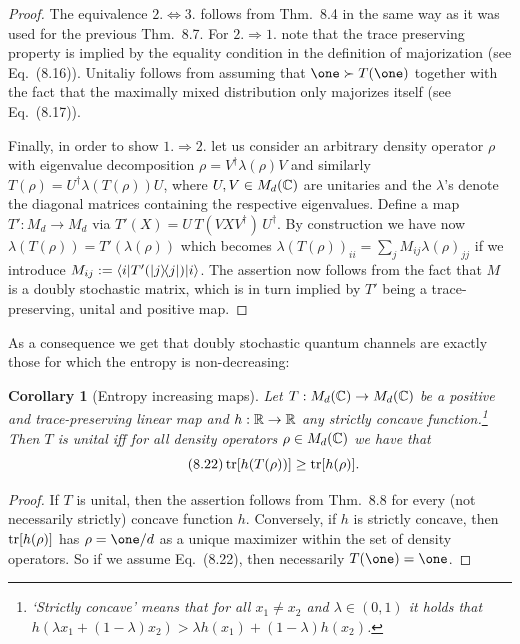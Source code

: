\documentclass[11pt,a4paper]{article}
\theoremstyle{plain}
\newtheorem{corollary}{Corollary}[section]
\theoremstyle{definition}
\theoremstyle{remark}
\begin{document}
\begin{proof}
    The equivalence $2.\Leftrightarrow 3$. follows from Thm.~8.4 in the same way as it was used for the previous Thm.~8.7. For $2.\Rightarrow 1$.
    note that the trace preserving property is implied by the equality condition in the definition of majorization (see Eq.~(8.16)). Unitaliy follows
    from assuming that $\one \succ T(\one)$ together with the fact that the maximally mixed distribution only majorizes itself (see Eq.~(8.17)).

    Finally, in order to show $1.\Rightarrow 2$. let us consider an arbitrary density operator $\rho$ with eigenvalue decomposition
    $\rho = V^\dagger \lambda(\rho) V$ and similarly $T(\rho)=U^\dagger \lambda(T(\rho))U$, where $U,V\in M_d(\mathbb{C})$ are unitaries and the
    $\lambda$'s denote the diagonal matrices containing the respective eigenvalues. Define a map $T':M_d\to M_d$ via
    $T'(X)=U\,T(VXV^\dagger)\,U^\dagger$. By construction we have now $\lambda(T(\rho))=T'(\lambda(\rho))$ which becomes
    $\lambda(T(\rho))_{ii}=\sum_j M_{ij}\lambda(\rho)_{jj}$ if we introduce $M_{ij}:=\langle i|T'(|j\rangle\!\langle j|)|i\rangle$.
    The assertion now follows from the fact that $M$ is a doubly stochastic matrix, which is in turn implied by $T'$ being a trace-preserving,
    unital and positive map.
\end{proof}

As a consequence we get that doubly stochastic quantum channels are exactly those for which the entropy is non-decreasing:

\begin{corollary}[Entropy increasing maps]
    Let $T:M_d(\mathbb{C})\to M_d(\mathbb{C})$ be a positive and trace-preserving linear map and $h:\mathbb{R}\to\mathbb{R}$ any strictly concave function.\footnote{`Strictly concave' means that for all $x_1\neq x_2$ and $\lambda\in(0,1)$ it holds that
        $h(\lambda x_1+(1-\lambda)x_2) > \lambda h(x_1) + (1-\lambda)h(x_2)$.}
    Then $T$ is unital iff for all density operators $\rho\in M_d(\mathbb{C})$ we have that
    \begin{equation}\tag{8.22}
        \operatorname{tr}[h(T(\rho))]\ge \operatorname{tr}[h(\rho)].
    \end{equation}
\end{corollary}

\begin{proof}
    If $T$ is unital, then the assertion follows from Thm.~8.8 for every (not necessarily strictly) concave function $h$.
    Conversely, if $h$ is strictly concave, then $\operatorname{tr}[h(\rho)]$ has $\rho=\one/d$ as a unique maximizer within the set of density operators.
    So if we assume Eq.~(8.22), then necessarily $T(\one)=\one$.
\end{proof}
\end{document}

